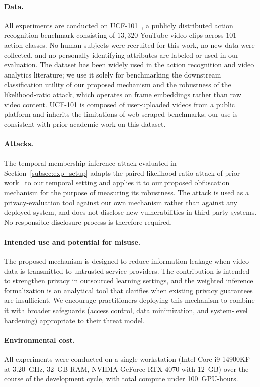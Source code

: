 \documentclass[sigconf,anonymous, review]{acmart}
\begin{document}
\paragraph{Data.}
All experiments are conducted on UCF-101~\cite{soomro2012ucf101}, a publicly distributed action recognition benchmark consisting of $13{,}320$ YouTube video clips across $101$ action classes. No human subjects were recruited for this work, no new data were collected, and no personally identifying attributes are labeled or used in our evaluation. The dataset has been widely used in the action recognition and video analytics literature; we use it solely for benchmarking the downstream classification utility of our proposed mechanism and the robustness of the likelihood-ratio attack, which operates on frame embeddings rather than raw video content. UCF-101 is composed of user-uploaded videos from a public platform and inherits the limitations of web-scraped benchmarks; our use is consistent with prior academic work on this dataset.

\paragraph{Attacks.}
The temporal membership inference attack evaluated in Section~\ref{subsec:exp_setup} adapts the paired likelihood-ratio attack of prior work~\cite{xiao2024formal} to our temporal setting and applies it to our proposed obfuscation mechanism for the purpose of measuring its robustness. The attack is used as a privacy-evaluation tool against our own mechanism rather than against any deployed system, and does not disclose new vulnerabilities in third-party systems. No responsible-disclosure process is therefore required.

\paragraph{Intended use and potential for misuse.}
The proposed mechanism is designed to reduce information leakage when video data is transmitted to untrusted service providers. The contribution is intended to strengthen privacy in outsourced learning settings, and the weighted inference formalization is an analytical tool that clarifies when existing privacy guarantees are insufficient. We encourage practitioners deploying this mechanism to combine it with broader safeguards (access control, data minimization, and system-level hardening) appropriate to their threat model.

\paragraph{Environmental cost.}
All experiments were conducted on a single workstation (Intel Core i9-14900KF at 3.20~GHz, 32~GB RAM, NVIDIA GeForce RTX 4070 with 12~GB) over the course of the development cycle, with total compute under 100~GPU-hours.
\end{document}
